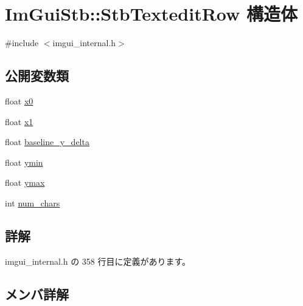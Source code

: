 \hypertarget{struct_im_gui_stb_1_1_stb_textedit_row}{}\section{Im\+Gui\+Stb\+:\+:Stb\+Textedit\+Row 構造体}
\label{struct_im_gui_stb_1_1_stb_textedit_row}


{\ttfamily \#include $<$imgui\+\_\+internal.\+h$>$}

\subsection*{公開変数類}
\begin{DoxyCompactItemize}
\item 
float \mbox{\hyperlink{struct_im_gui_stb_1_1_stb_textedit_row_a54de789c8fab0c5ad31582205b5ffc8a}{x0}}
\item 
float \mbox{\hyperlink{struct_im_gui_stb_1_1_stb_textedit_row_a53dcf8609e65440d8f16c6e531c21bc3}{x1}}
\item 
float \mbox{\hyperlink{struct_im_gui_stb_1_1_stb_textedit_row_a0a5d9561ecf2294b3341935f85b476a5}{baseline\+\_\+y\+\_\+delta}}
\item 
float \mbox{\hyperlink{struct_im_gui_stb_1_1_stb_textedit_row_a0c8be0676857e3a182ab73d1782e5da0}{ymin}}
\item 
float \mbox{\hyperlink{struct_im_gui_stb_1_1_stb_textedit_row_a24b4b9e6983914519d01335b4014a774}{ymax}}
\item 
int \mbox{\hyperlink{struct_im_gui_stb_1_1_stb_textedit_row_a7c8074c51d638753e44cb808fd5698ae}{num\+\_\+chars}}
\end{DoxyCompactItemize}


\subsection{詳解}


 imgui\+\_\+internal.\+h の 358 行目に定義があります。



\subsection{メンバ詳解}
\mbox{\label{struct_im_gui_stb_1_1_stb_textedit_row_a0a5d9561ecf2294b3341935f85b476a5}} 
